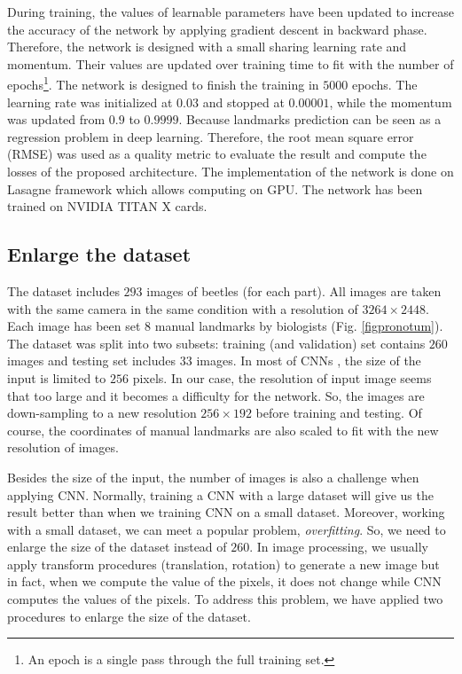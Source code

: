 \documentclass[10pt]{article}
\begin{document}
During training, the values of learnable parameters have been updated to increase the accuracy of the network by applying gradient descent in backward phase. Therefore, the network is designed with a small sharing learning rate and momentum. Their values are updated over training time to fit with the number of epochs\footnote{An epoch is a single pass through the full training set.}. The network is designed to finish the training in $5000$ epochs. The learning rate was initialized at $0.03$ and stopped at $0.00001$, while the momentum was updated from $0.9$ to $0.9999$. 
Because landmarks prediction can be seen as a regression problem in deep learning. Therefore, the root mean square error (RMSE) was used as a quality metric to evaluate the result and compute the losses of the proposed architecture. The implementation of the network is done on Lasagne framework \cite{lasagne} which allows computing on GPU. The network has been trained on NVIDIA TITAN X cards.

\subsection{Enlarge the dataset}
\label{sec_data}
The dataset includes $293$ images of beetles (for each part). All images are taken with the same camera in the same condition with a resolution of $3264 \times 2448$. Each image has been set $8$ manual landmarks by biologists (Fig. \ref{figpronotum}). The dataset was split into two subsets: training (and validation) set contains $260$ images and testing set includes $33$ images. In most of CNNs \cite{lecun2010convolutional, sun2013deep,  krizhevsky2012imagenet, cintas2016automatic}, the size of the input is limited to $256$ pixels. In our case, the resolution of input image seems that too large and it becomes a difficulty for the network. So, the images are down-sampling to a new resolution $256 \times 192$ before training and testing. Of course, the coordinates of manual landmarks are also scaled to fit with the new resolution of images.

Besides the size of the input, the number of images is also a challenge when applying CNN. Normally, training a CNN with a large dataset will give us the result better than when we training CNN on a small dataset. Moreover, working with a small dataset, we can meet a popular problem, \textit{overfitting}. So, we need to enlarge the size of the dataset instead of $260$. In image processing, we usually apply transform procedures (translation, rotation) to generate a new image but in fact, when we compute the value of the pixels, it does not change while CNN computes the values of the pixels. To address this problem, we have applied two procedures to enlarge the size of the dataset.
\end{document}

